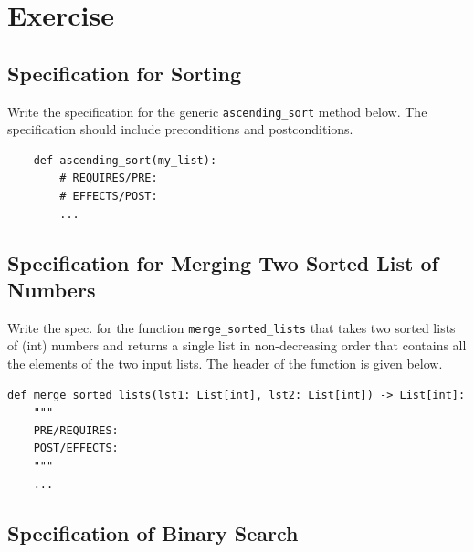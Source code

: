 \documentclass[oneside,11pt,dvipsnames]{book}
\newcommand{\code}[1]{\texttt{#1}}
\begin{document}

\section{Exercise}

\subsection{Specification for Sorting}\label{exercise:specs-sort}
Write the specification for the generic \code{ascending\_sort} method below. The specification should include preconditions and postconditions.
\begin{lstlisting}
    def ascending_sort(my_list):
        # REQUIRES/PRE: 
        # EFFECTS/POST: 
        ...
\end{lstlisting}
    

\subsection{Specification for Merging Two Sorted List of Numbers}\label{exercise:specs-merge-lists}
Write the spec. for the function \code{merge\_sorted\_lists} that takes two sorted lists of (int) numbers and returns a single list in non-decreasing order that contains all the elements of the two input lists. The header of the function is given below.

\begin{lstlisting}
def merge_sorted_lists(lst1: List[int], lst2: List[int]) -> List[int]:
    """
    PRE/REQUIRES: 
    POST/EFFECTS: 
    """
    ...
\end{lstlisting}

\subsection{Specification of Binary Search}\label{exercise:specs-binary-search}
\end{document}

